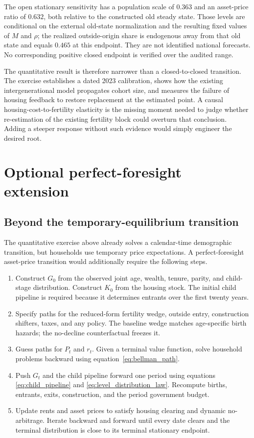 \documentclass[11pt]{article}
\theoremstyle{definition}
\newcommand{\1}{\mathbf 1}
\newif\iftechnicalappendix
\begin{document}
The open stationary sensitivity has a population scale of \(0.363\) and an
asset-price ratio of \(0.632\), both relative to the constructed old steady
state. Those levels are conditional on the external old-state normalization
and the resulting fixed values of \(M\) and \(\rho\); the realized outside-origin
share is endogenous away from that old state and equals \(0.465\) at this
endpoint. They are not identified national forecasts. No corresponding
positive closed endpoint is verified over the audited range.

The quantitative result is therefore narrower than a closed-to-closed
transition. The exercise establishes a dated 2023 calibration, shows how the
existing intergenerational model propagates cohort size, and measures the
failure of housing feedback to restore replacement at the estimated point. A
causal housing-cost-to-fertility elasticity is the missing moment needed to
judge whether re-estimation of the existing fertility block could overturn
that conclusion. Adding a steeper response without such evidence would simply
engineer the desired root.
\iftechnicalappendix
\section{Optional perfect-foresight extension}
\label{sec:implementation}

\subsection{Beyond the temporary-equilibrium transition}

The quantitative exercise above already solves a calendar-time demographic
transition, but households use temporary price expectations. A
perfect-foresight asset-price transition would additionally require the
following steps.
\begin{enumerate}
 \item Construct $G_0$ from the observed joint age, wealth, tenure, parity, and
 child-stage distribution. Construct $K_0$ from the housing stock. The initial
 child pipeline is required because it determines entrants over the first
 twenty years.
 \item Specify paths for the reduced-form fertility wedge, outside entry,
 construction shifters, taxes, and any policy. The baseline wedge matches
 age-specific birth hazards; the no-decline counterfactual freezes it.
 \item Guess paths for $P_t$ and $r_t$. Given a terminal value function, solve
 household problems backward using equation~\eqref{eq:bellman_path}.
 \item Push $G_t$ and the child pipeline forward one period using equations
 \eqref{eq:child_pipeline} and \eqref{eq:level_distribution_law}. Recompute births, entrants, exits,
 construction, and the period government budget.
 \item Update rents and asset prices to satisfy housing clearing and dynamic
 no-arbitrage. Iterate backward and forward until every date clears and the
 terminal distribution is close to its terminal stationary endpoint.
\end{enumerate}
\end{document}
